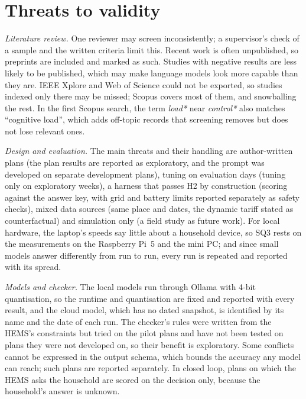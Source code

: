 \section{Threats to validity}
\label{sec:validity}

\textit{Literature review.} One reviewer may screen inconsistently; a
supervisor's check of a sample and the written criteria limit this.
Recent work is often unpublished, so preprints are included and marked
as such. Studies with negative results are less likely to be published,
which may make language models look more capable than they are. IEEE
Xplore and Web of Science could not be exported, so studies indexed only
there may be missed; Scopus covers most of them, and snowballing the
rest. In the first Scopus search, the term \textit{load*} near
\textit{control*} also matches ``cognitive load'', which adds
off-topic records that screening removes but does not lose relevant ones.

\textit{Design and evaluation.} The main threats and their handling are
author-written plans (the plan results are reported as exploratory, and
the prompt was developed on separate development plans), tuning on
evaluation days (tuning only on exploratory weeks), a harness that
passes H2 by construction (scoring against the answer key, with grid
and battery limits reported separately as safety checks), mixed data
sources (same place and dates, the dynamic tariff stated as
counterfactual) and simulation only (a field study as future work).
For local hardware, the laptop's speeds say little about a household
device, so SQ3 rests on the measurements on the Raspberry Pi~5 and the
mini PC; and since small models answer differently from run to run,
every run is repeated and reported with its spread.

\textit{Models and checker.} The local models run through Ollama with
4-bit quantisation, so the runtime and quantisation are fixed and
reported with every result, and the cloud model, which has no dated
snapshot, is identified by its name and the date of each run. The
checker's rules were written from the HEMS's constraints but tried on
the pilot plans and have not been tested on plans they were not
developed on, so their benefit is exploratory. Some conflicts cannot be expressed in the output schema,
which bounds the accuracy any model can reach; such plans are reported
separately. In closed loop, plans on which the HEMS asks the household
are scored on the decision only, because the household's answer is
unknown.


